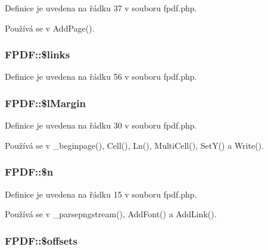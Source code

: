 Definice je uvedena na řádku 37 v souboru fpdf.\-php.



Používá se v Add\-Page().

\hypertarget{class_f_p_d_f_ad75c5e32c5417504ba4d351e0383869f}{
\subsubsection[{\$links}]{\setlength{\rightskip}{0pt plus 5cm}F\-P\-D\-F\-::\$links}}\label{class_f_p_d_f_ad75c5e32c5417504ba4d351e0383869f}


Definice je uvedena na řádku 56 v souboru fpdf.\-php.

\hypertarget{class_f_p_d_f_a52016e769b24e87eae66b3f3a7e9eb97}{
\subsubsection[{\$l\-Margin}]{\setlength{\rightskip}{0pt plus 5cm}F\-P\-D\-F\-::\$l\-Margin}}\label{class_f_p_d_f_a52016e769b24e87eae66b3f3a7e9eb97}


Definice je uvedena na řádku 30 v souboru fpdf.\-php.



Používá se v \-\_\-beginpage(), Cell(), Ln(), Multi\-Cell(), Set\-Y() a Write().

\hypertarget{class_f_p_d_f_a718a78c2c592d0a027429947df12d161}{
\subsubsection[{\$n}]{\setlength{\rightskip}{0pt plus 5cm}F\-P\-D\-F\-::\$n}}\label{class_f_p_d_f_a718a78c2c592d0a027429947df12d161}


Definice je uvedena na řádku 15 v souboru fpdf.\-php.



Používá se v \-\_\-parsepngstream(), Add\-Font() a Add\-Link().

\hypertarget{class_f_p_d_f_a15347dda89239d5fa79ead40a72e0e34}{
\subsubsection[{\$offsets}]{\setlength{\rightskip}{0pt plus 5cm}F\-P\-D\-F\-::\$offsets}}\label{class_f_p_d_f_a15347dda89239d5fa79ead40a72e0e34}


